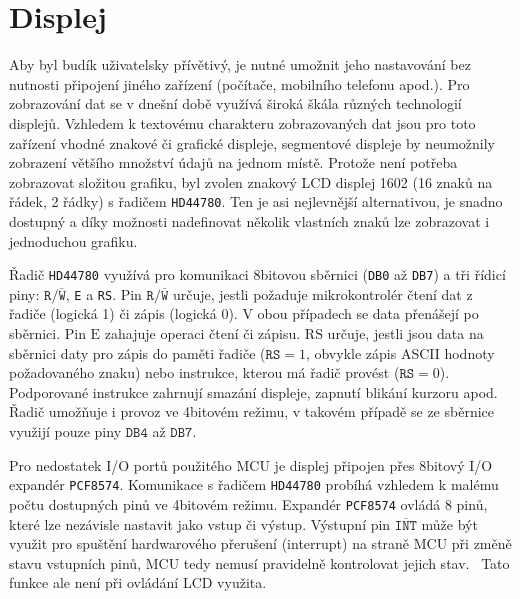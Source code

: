 \section{Displej}
Aby byl budík uživatelsky přívětivý, je nutné umožnit jeho nastavování bez
nutnosti připojení jiného zařízení (počítače, mobilního telefonu apod.).
Pro zobrazování dat se v dnešní době využívá široká škála různých technologií
displejů. Vzhledem k textovému charakteru zobrazovaných dat jsou pro toto
zařízení vhodné znakové či grafické displeje, segmentové displeje by neumožnily
zobrazení většího množství údajů na jednom místě. Protože není potřeba
zobrazovat složitou grafiku, byl zvolen znakový LCD displej 1602 (16 znaků na
řádek, 2 řádky) s řadičem \texttt{HD44780}. Ten je asi nejlevnější
alternativou, je snadno dostupný a díky možnosti nadefinovat několik vlastních
znaků lze zobrazovat i jednoduchou grafiku.

Řadič \texttt{HD44780} využívá pro komunikaci 8bitovou sběrnici (\texttt{DB0}
až \texttt{DB7}) a tři řídicí piny: $\texttt{R}/\overline{\texttt{W}}$,
\texttt{E} a \texttt{RS}. Pin $\texttt{R}/\overline{\texttt{W}}$ určuje,
jestli požaduje mikrokontrolér čtení dat z řadiče (logická 1)
či zápis (logická 0). V obou případech se data přenášejí po sběrnici.
Pin $\mathrm{E}$ zahajuje operaci čtení či zápisu. $\mathrm{RS}$ určuje, jestli
jsou data na sběrnici daty pro zápis do paměti řadiče ($\texttt{RS} = 1$,
obvykle zápis ASCII hodnoty požadovaného znaku) nebo instrukce, kterou má řadič
provést ($\texttt{RS} = 0$). Podporované instrukce zahrnují smazání displeje,
zapnutí blikání kurzoru apod. Řadič umožňuje i provoz ve 4bitovém režimu,
v takovém případě se ze sběrnice využijí pouze piny $\texttt{DB4}$ až
$\texttt{DB7}$.~\cite{dshHD44780}

Pro nedostatek I/O portů použitého MCU je displej připojen přes
8bitový \IIC{} I/O expandér \texttt{PCF8574}. Komunikace s řadičem
\texttt{HD44780} probíhá vzhledem k malému počtu dostupných pinů ve 4bitovém
režimu. Expandér \texttt{PCF8574} ovládá 8 pinů, které lze nezávisle nastavit
jako vstup či výstup. Výstupní pin $\overline{\texttt{INT}}$ může být využit
pro spuštění hardwarového přerušení (interrupt) na straně MCU při změně stavu
vstupních pinů, MCU tedy nemusí pravidelně kontrolovat jejich
stav.~\cite{dshPCF8574} Tato funkce ale není při ovládání LCD využita.

